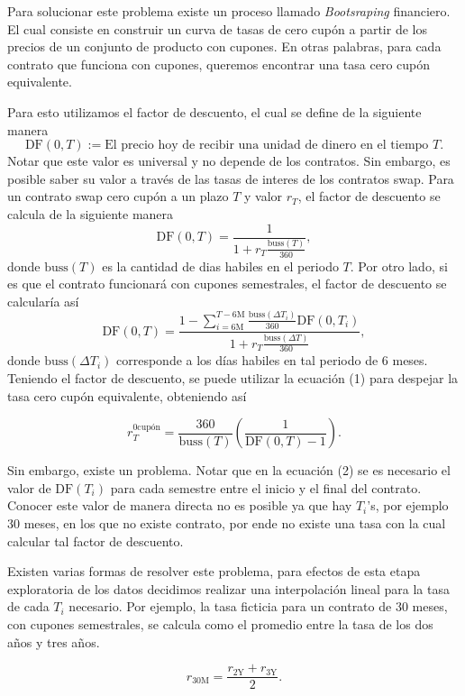 \qquad Para solucionar este problema existe un proceso llamado \textit{Bootsraping} financiero. El cual consiste en construir un curva de tasas de cero cupón a partir de los precios de un conjunto de producto con cupones. En otras palabras, para cada contrato que funciona con cupones, queremos encontrar una tasa cero cupón equivalente.

\qquad Para esto utilizamos el factor de descuento, el cual se define de la siguiente manera
$$ \text{DF}(0,T) := \text{El precio hoy de recibir una unidad de dinero en el tiempo } T.$$
Notar que este valor es universal y no depende de los contratos. Sin embargo, es posible saber su valor a través de las tasas de interes de los contratos swap. Para un contrato swap cero cupón a un plazo $T$ y valor $r_T$, el factor de descuento se calcula de la siguiente manera
\begin{equation}
    \text{DF}(0,T) = \dfrac{1}{1 + r_T \frac{\text{buss}(T)}{360}},
\end{equation}
donde $\text{buss}(T)$ es la cantidad de dias habiles en el periodo $T$. Por otro lado, si es que el contrato funcionará con cupones semestrales, el factor de descuento se calcularía así
\begin{equation}
    \text{DF}(0,T) = \dfrac{1 - \sum_{i= 6\text{M}}^{T - 6\text{M}} \frac{\text{buss}(\Delta T_i)}{360} \text{DF}(0, T_i)}{1 + r_T \frac{\text{buss}(\Delta T)}{360}},
\end{equation}
donde $\text{buss}(\Delta T_i)$ corresponde a los días habiles en tal periodo de 6 meses. Teniendo el factor de descuento, se puede utilizar la ecuación (1) para despejar la tasa cero cupón equivalente, obteniendo así

\begin{equation}
    r_T^{\text{0cupón}} = \dfrac{360}{\text{buss}(T)}\left( \dfrac{1}{\text{DF}(0,T) - 1}\right).
\end{equation}

\qquad Sin embargo, existe un problema. Notar que en la ecuación (2) se es necesario el valor de $\text{DF}(T_i)$ para cada semestre entre el inicio y el final del contrato. Conocer este valor de manera directa no es posible ya que hay $T_i$'s, por ejemplo 30 meses, en los que no existe contrato, por ende no existe una tasa con la cual calcular tal factor de descuento.

\qquad Existen varias formas de resolver este problema, para efectos de esta etapa exploratoria de los datos decidimos realizar una interpolación lineal para la tasa de cada $T_i$ necesario. Por ejemplo, la tasa ficticia para un contrato de 30 meses, con cupones semestrales, se calcula como el promedio entre la tasa de los dos años y tres años.

$$r_{30 \text{M}} = \dfrac{r_{2 \text{Y}} + r_{3 \text{Y}}}{2}.$$